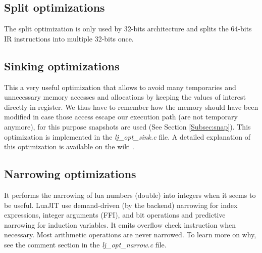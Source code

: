 
\subsection{Split optimizations}
\label{Subsec:opt-split}

The split optimization is only used by 32-bits architecture and splits the
64-bits IR instructions into multiple 32-bits once.


\subsection{Sinking optimizations}
\label{Subsec:opt-sinking}
This a very useful optimization that allows to avoid many temporaries and
unnecessary memory accesses and allocations by keeping the values of interest
directly in register. We thus have to remember how the memory should have been
modified in case those access escape our execution path (are not temporary
anymore), for this purpose snapshots are used (See Section \ref{Subsec:snap}).
This optimization is implemented in the \emph{lj\_opt\_sink.c} file. A detailed
explanation of this optimization is available on the wiki \cite{luajit-sink}.


\subsection{Narrowing optimizations}
\label{Subsec:narrowing}

It performs the narrowing of lua numbers (double) into integers when it seems
to be useful. LuaJIT use demand-driven (by the backend) narrowing for index
expressions, integer arguments (FFI), and bit operations and predictive
narrowing for induction variables. It emits overflow check instruction when
necessary. Most arithmetic operations are never narrowed. To learn more on why,
see the comment section in the \emph{lj\_opt\_narrow.c} file.

